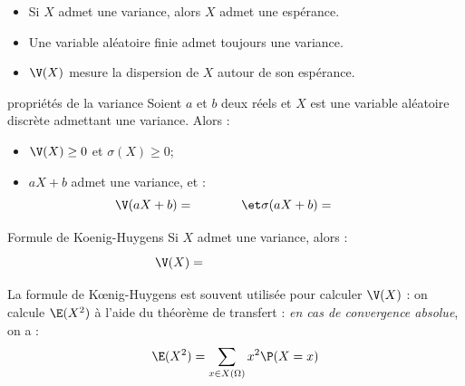 \documentclass[french,11pt,twoside]{VcCours}
\begin{document}
\begin{Demonstration}{} 

\vspace*{3.5cm}
\end{Demonstration}

\begin{Remarques}{}
\begin{itemize} 
\item Si $X$ admet une variance, alors $X$ admet une espérance.
\item Une variable aléatoire finie admet toujours une variance.
\item $\V(X)$ mesure la dispersion de $X$ autour de son espérance.
\end{itemize}
\end{Remarques}

\begin{Proposition}{propriétés de la variance}
Soient $a$ et $b$ deux réels et $X$ est une variable aléatoire discrète admettant une variance. Alors :
\begin{itemize}
 \item $\V(X) \geq 0$ et $\sigma(X) \geq 0$;
 \item $aX+b$ admet une variance, et :  
$$\V(aX+b) = \phantom{a^2 \V(X)} \et \sigma(aX+b) = \phantom{\vert a \vert \sigma(X)} $$
\end{itemize}
\end{Proposition}

\begin{Demonstration}{}

\vspace*{4cm}
\end{Demonstration}

\begin{Proposition}{Formule de Koenig-Huygens}
Si $X$ admet une variance, alors :
$$\V(X) = \phantom{\E\big(X^2\big) - \big(\E(X)\big)^2}$$
\end{Proposition}

\begin{Demonstration}{}
\vspace*{3cm}
\end{Demonstration}

\begin{Methode}{} 
La formule de Kœnig-Huygens est souvent utilisée pour calculer $\V(X)$ : on calcule $\E(X^2)$ à l'aide du {théorème de transfert} : \emph{en cas de convergence absolue}, on a : 
$$\E(X^2)=\sum\limits_{x\in X(\Omega)} x^2  \P(X=x)$$
\end{Methode}
\end{document}
